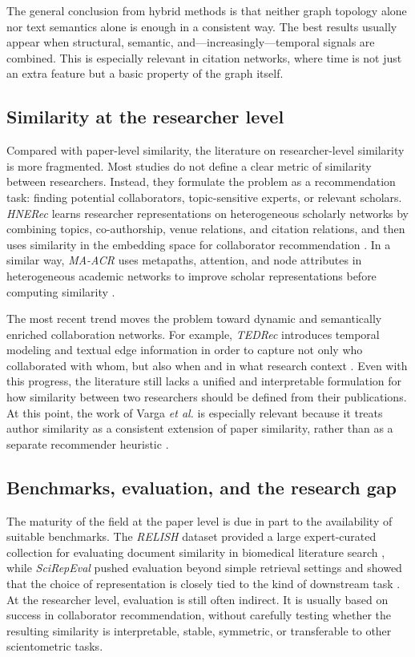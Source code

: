 \documentclass[11pt]{article}
\begin{document}
The general conclusion from hybrid methods is that neither graph topology alone nor text semantics alone is enough in a consistent way. The best results usually appear when structural, semantic, and---increasingly---temporal signals are combined. This is especially relevant in citation networks, where time is not just an extra feature but a basic property of the graph itself.

\subsection{Similarity at the researcher level}

Compared with paper-level similarity, the literature on researcher-level similarity is more fragmented. Most studies do not define a clear metric of similarity between researchers. Instead, they formulate the problem as a recommendation task: finding potential collaborators, topic-sensitive experts, or relevant scholars. \emph{HNERec} learns researcher representations on heterogeneous scholarly networks by combining topics, co-authorship, venue relations, and citation relations, and then uses similarity in the embedding space for collaborator recommendation \cite{liu2023hnerec}. In a similar way, \emph{MA-ACR} uses metapaths, attention, and node attributes in heterogeneous academic networks to improve scholar representations before computing similarity \cite{li2024maacr}.

The most recent trend moves the problem toward dynamic and semantically enriched collaboration networks. For example, \emph{TEDRec} introduces temporal modeling and textual edge information in order to capture not only who collaborated with whom, but also when and in what research context \cite{guan2025tedrec}. Even with this progress, the literature still lacks a unified and interpretable formulation for how similarity between two researchers should be defined from their publications. At this point, the work of Varga \emph{et al.} is especially relevant because it treats author similarity as a consistent extension of paper similarity, rather than as a separate recommender heuristic \cite{varga2025transition}.

\subsection{Benchmarks, evaluation, and the research gap}

The maturity of the field at the paper level is due in part to the availability of suitable benchmarks. The \emph{RELISH} dataset provided a large expert-curated collection for evaluating document similarity in biomedical literature search \cite{brown2019relish}, while \emph{SciRepEval} pushed evaluation beyond simple retrieval settings and showed that the choice of representation is closely tied to the kind of downstream task \cite{singh2023scirepeval}. At the researcher level, evaluation is still often indirect. It is usually based on success in collaborator recommendation, without carefully testing whether the resulting similarity is interpretable, stable, symmetric, or transferable to other scientometric tasks.
\end{document}

